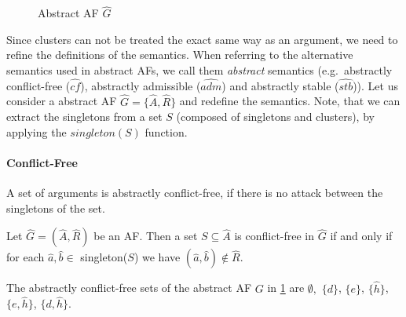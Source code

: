 \begin{figure}[h]
    \centering
    \caption{Abstract AF $\hat{G}$}
    \label{af:backgroundExampleClusterSpurious}
\end{figure}


Since clusters can not be treated the exact same way as an argument, we need to refine the definitions of the semantics. When referring to the alternative semantics used in abstract AFs, we call them \emph{abstract} semantics (e.g.\ abstractly conflict-free ($\hat{cf}$), abstractly admissible ($\hat{adm}$) and abstractly stable ($\hat{stb}$)). Let us consider a abstract AF $\hat{G}=\{\hat{A}, \hat{R}\}$ and redefine the semantics. Note, that we can extract the singletons from a set $S$ (composed of singletons and clusters), by applying the $singleton(S)$ function.

\paragraph{Conflict-Free} A set of arguments is abstractly conflict-free, if there is no attack between the singletons of the set.

\begin{definition}
    Let $\hat{G}=(\hat{A},\hat{R})$ be an AF. Then a set  $S \subseteq \hat{A}$ is conflict-free in $\hat{G}$ if and only if for each $\hat{a}, \hat{b} \in$ singleton($S$) we have $(\hat{a}, \hat{b}) \not\in \hat{R}$.
\end{definition}

\begin{example}
    The abstractly conflict-free sets of the abstract AF $G$ in \cref{af:backgroundExampleClusterSpurious} are 
    $\emptyset,$
    $\{d\}$,
    $\{e\}$,
    $\{\hat{h}\}$,
    $\{e, \hat{h}\}$,
    $\{d, \hat{h}\}$.
\end{example}




